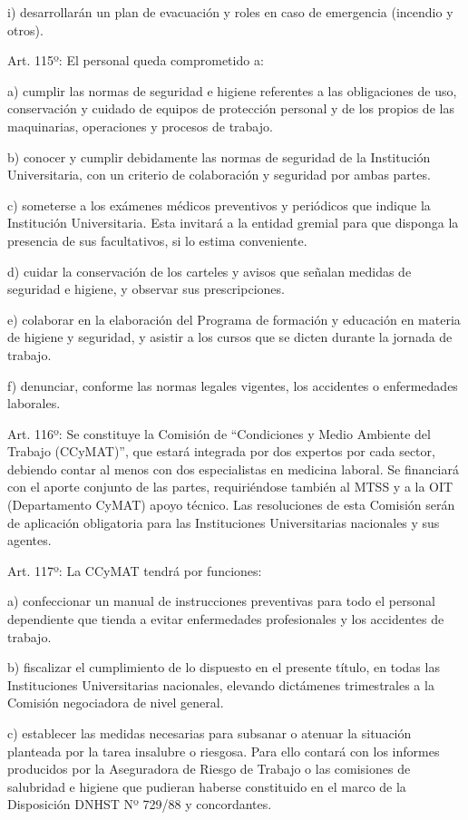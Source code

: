 \documentclass[]{article}
\begin{document}
i) desarrollarán un plan de evacuación y roles en caso de emergencia
(incendio y otros).

Art. 115º: El personal queda comprometido a:

a) cumplir las normas de seguridad e higiene referentes a las
obligaciones de uso, conservación y cuidado de equipos de protección
personal y de los propios de las maquinarias, operaciones y procesos de
trabajo.

b) conocer y cumplir debidamente las normas de seguridad de la
Institución Universitaria, con un criterio de colaboración y seguridad
por ambas partes.

c) someterse a los exámenes médicos preventivos y periódicos que indique
la Institución Universitaria. Esta invitará a la entidad gremial para
que disponga la presencia de sus facultativos, si lo estima conveniente.

d) cuidar la conservación de los carteles y avisos que señalan medidas
de seguridad e higiene, y observar sus prescripciones.

e) colaborar en la elaboración del Programa de formación y educación en
materia de higiene y seguridad, y asistir a los cursos que se dicten
durante la jornada de trabajo.

f) denunciar, conforme las normas legales vigentes, los accidentes o
enfermedades laborales.

Art. 116º: Se constituye la Comisión de ``Condiciones y Medio Ambiente
del Trabajo (CCyMAT)'', que estará integrada por dos expertos por cada
sector, debiendo contar al menos con dos especialistas en medicina
laboral. Se financiará con el aporte conjunto de las partes,
requiriéndose también al MTSS y a la OIT (Departamento CyMAT) apoyo
técnico. Las resoluciones de esta Comisión serán de aplicación
obligatoria para las Instituciones Universitarias nacionales y sus
agentes.

Art. 117º: La CCyMAT tendrá por funciones:

a) confeccionar un manual de instrucciones preventivas para todo el
personal dependiente que tienda a evitar enfermedades profesionales y
los accidentes de trabajo.

b) fiscalizar el cumplimiento de lo dispuesto en el presente título, en
todas las Instituciones Universitarias nacionales, elevando dictámenes
trimestrales a la Comisión negociadora de nivel general.

c) establecer las medidas necesarias para subsanar o atenuar la
situación planteada por la tarea insalubre o riesgosa. Para ello contará
con los informes producidos por la Aseguradora de Riesgo de Trabajo o
las comisiones de salubridad e higiene que pudieran haberse constituido
en el marco de la Disposición DNHST Nº 729/88 y concordantes.
\end{document}
